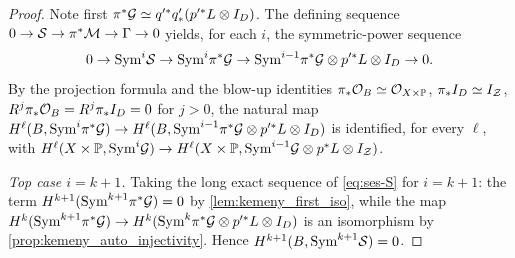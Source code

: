 \begin{proof}
  Note first \(\pi^*\mathcal{G}\simeq q'^*q'_*(p'^*L\otimes I_D)\).  The defining sequence
  \(0\to\mathcal{S}\to\pi^*\mathcal{M}\to\Gamma\to0\) yields, for each \(i\), the
  symmetric-power sequence
  \begin{equation}\label{eq:ses-S}
    0\to\mathrm{Sym}^i\mathcal{S}\to\mathrm{Sym}^i\pi^*\mathcal{G}\to\mathrm{Sym}^{i-1}\pi^*\mathcal{G}\otimes p'^*L\otimes I_D\to0 .
  \end{equation}
  By the projection formula and the blow-up identities
  \(\pi_*\mathcal{O}_B\simeq\mathcal{O}_{X\times\mathbb{P}}\), \(\pi_*I_D\simeq I_{\mathcal{Z}}\),
  \(R^j\pi_*\mathcal{O}_B=R^j\pi_*I_D=0\) for \(j>0\), the natural map
  \(H^\ell(B,\mathrm{Sym}^i\pi^*\mathcal{G})\to H^\ell(B,\mathrm{Sym}^{i-1}\pi^*\mathcal{G}\otimes p'^*L\otimes I_D)\)
  is identified, for every \(\ell\), with
  \(H^\ell(X\times\mathbb{P},\mathrm{Sym}^i\mathcal{G})\to
    H^\ell(X\times\mathbb{P},\mathrm{Sym}^{i-1}\mathcal{G}\otimes p^*L\otimes I_{\mathcal{Z}})\).

  \emph{Top case \(i=k+1\).}  Taking the long exact sequence of
  \eqref{eq:ses-S} for \(i=k+1\): the term \(H^{k+1}(\mathrm{Sym}^{k+1}\pi^*\mathcal{G})=0\) by
  \cref{lem:kemeny_first_iso}, while the map
  \(H^k(\mathrm{Sym}^{k+1}\pi^*\mathcal{G})\to H^k(\mathrm{Sym}^k\pi^*\mathcal{G}\otimes p'^*L\otimes I_D)\) is an
  isomorphism by \cref{prop:kemeny_auto_injectivity}.  Hence
  \(H^{k+1}(B,\mathrm{Sym}^{k+1}\mathcal{S})=0\).


\end{proof}
